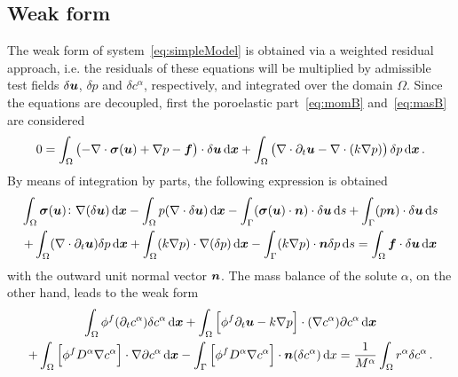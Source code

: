 \documentclass[a4paper,DIV=12,10pt]{scrartcl}
\newcommand{\U}[0]{\vek{u}}
\newcommand{\x}[0]{\vek{x}}
\begin{document}
\subsection{Weak form}
\label{sec:weakform}

The weak form of system~\eqref{eq:simpleModel} is obtained via a weighted
residual approach, i.e. the residuals of these equations will be multiplied by
admissible test fields $\delta \U$, $\delta p$ and $\delta c^\alpha$,
respectively, and integrated over the domain $\Omega$. Since the equations are
decoupled, first the poroelastic part~\eqref{eq:momB} and~\eqref{eq:masB} are
considered 
\begin{equation}
  \label{eq:weakF1}
  0 = 
  \int_\Omega \left( -\nabla \cdot \vek{\sigma}(\U) + \nabla p - \vek{f} \right) 
  \cdot \delta \U  \dif \x + 
  \int_\Omega \left( \nabla \cdot \partial_t \U - 
    \nabla \cdot (k \nabla p) \right) \delta p \dif \x \,.
\end{equation}
By means of integration by parts, the following expression is obtained
\begin{multline}
  \label{eq:weakF2}
  \int_\Omega \vek{\sigma}(\U) \colon \nabla (\delta \U) \dif \x - 
  \int_\Omega p (\nabla \cdot \delta \U) \dif \x -
  \int_\Gamma (\vek{\sigma}(\U) \cdot \vek{n}) \cdot \delta \U \dif s +
  \int_\Gamma (p \vek{n}) \cdot \delta \U \dif s \\
  + \int_\Omega (\nabla \cdot \partial_t \U) \delta p \dif \x +
  \int_\Omega (k \nabla p) \cdot \nabla (\delta p) \dif \x -
  \int_\Gamma (k \nabla p) \cdot \vek{n} \delta p \dif s =
  \int_\Omega \vek{f} \cdot \delta \U \dif \x
\end{multline}
with the outward unit normal vector $\boldsymbol{n}$.
The mass balance of the solute $\alpha$, on the other hand, leads to the weak
form 
\begin{multline}
  \label{eq:weakF3}
  \int_{\Omega} \phi^f (\partial_t c^\alpha) \delta c^\alpha \dif \x +
  \int_\Omega \left[ \phi^f \partial_t \U - k\nabla p \right] \cdot 
  (\nabla c^\alpha) \partial c^\alpha \dif \x   \\
  + \int_\Omega \left[ \phi^f D^\alpha \nabla c^\alpha\right] \cdot 
  \nabla \partial c^\alpha \dif \x - 
  \int_\Gamma \left[ \phi^f D^\alpha \nabla c^\alpha\right] \cdot \vek{n}
  (\delta c^\alpha) \dif x = 
  \frac{1}{M^\alpha} \int_\Omega r^\alpha \delta c^\alpha \,.
\end{multline}
\end{document}
